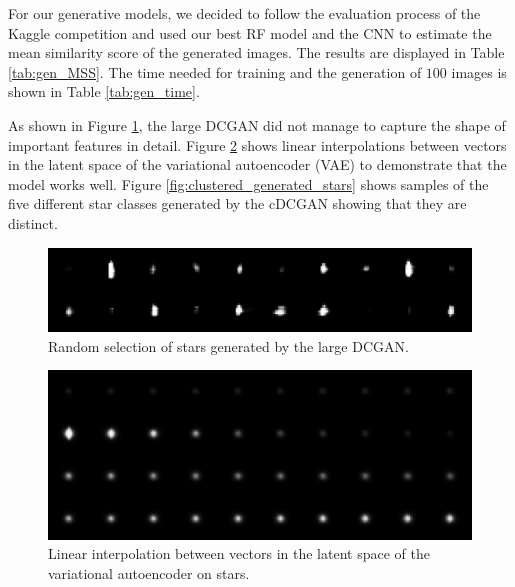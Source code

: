 \documentclass[10pt,conference,compsocconf]{IEEEtran}
\begin{document}



For our generative models, we decided to follow the evaluation process of the Kaggle competition and used our best RF model and the CNN to estimate the mean similarity score of the generated images. The results are displayed in Table \ref{tab:gen_MSS}. The time needed for training and the generation of $100$ images is shown in Table \ref{tab:gen_time}. 

As shown in Figure \ref{fig:dcgan_stars}, the large DCGAN did not manage to capture the shape of important features in detail. %
Figure \ref{fig:vae_interpolation} shows linear interpolations between vectors in the latent space of the variational autoencoder (VAE) to demonstrate that the model works well. Figure \ref{fig:clustered_generated_stars} shows samples of the five different star classes generated by the cDCGAN showing that they are distinct.

\begin{figure}%
    \centering
    \includegraphics[width=\columnwidth]{assets/star_ensemble_large_resized.png}
    \caption{Random selection of stars generated by the large DCGAN.}
    \label{fig:dcgan_stars}
\end{figure}

\begin{figure}
    \centering
    \includegraphics[width=\columnwidth]{assets/vae_interpolation_resized.png}
    \caption{Linear interpolation between vectors in the latent space of the variational autoencoder on stars.}
    \label{fig:vae_interpolation}
\end{figure}
\end{document}
